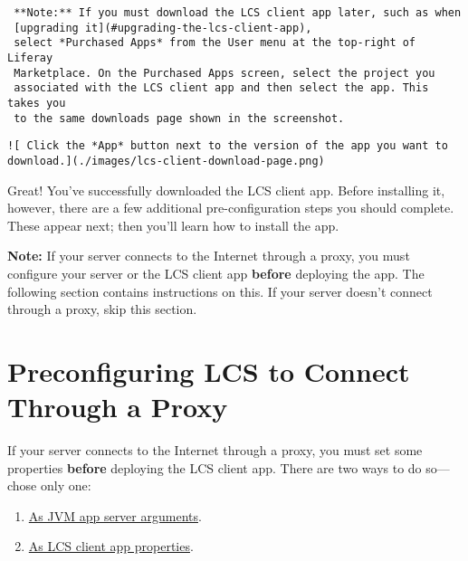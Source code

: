 \noindent\hrulefill

\begin{verbatim}
 **Note:** If you must download the LCS client app later, such as when
 [upgrading it](#upgrading-the-lcs-client-app), 
 select *Purchased Apps* from the User menu at the top-right of Liferay 
 Marketplace. On the Purchased Apps screen, select the project you 
 associated with the LCS client app and then select the app. This takes you 
 to the same downloads page shown in the screenshot. 
\end{verbatim}

\noindent\hrulefill

\begin{verbatim}
![ Click the *App* button next to the version of the app you want to download.](./images/lcs-client-download-page.png)
\end{verbatim}

Great! You've successfully downloaded the LCS client app. Before
installing it, however, there are a few additional pre-configuration
steps you should complete. These appear next; then you'll learn how to
install the app.

\noindent\hrulefill

\textbf{Note:} If your server connects to the Internet through a proxy,
you must configure your server or the LCS client app \textbf{before}
deploying the app. The following section contains instructions on this.
If your server doesn't connect through a proxy, skip this section.

\noindent\hrulefill

\section{Preconfiguring LCS to Connect Through a
Proxy}\label{preconfiguring-lcs-to-connect-through-a-proxy}

If your server connects to the Internet through a proxy, you must set
some properties \textbf{before} deploying the LCS client app. There are
two ways to do so---chose only one:

\begin{enumerate}
\def\labelenumi{\arabic{enumi}.}
\item
  \hyperref[jvm-app-server-arguments]{As JVM app server arguments}.
\item
  \hyperref[lcs-client-app-properties]{As LCS client app properties}.
\end{enumerate}

\noindent\hrulefill

